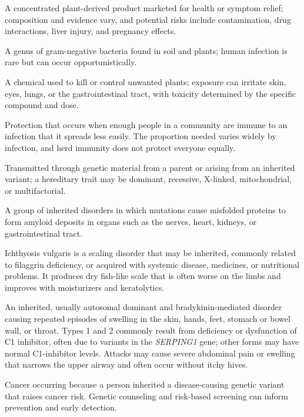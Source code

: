  A concentrated plant-derived product marketed for health or symptom relief; composition and evidence vary, and potential risks include contamination, drug interactions, liver injury, and pregnancy effects.

 A genus of gram-negative bacteria found in soil and plants; human infection is rare but can occur opportunistically.

 A chemical used to kill or control unwanted plants; exposure can irritate skin, eyes, lungs, or the gastrointestinal tract, with toxicity determined by the specific compound and dose.

 Protection that occurs when enough people in a community are immune to an infection that it spreads less easily. The proportion needed varies widely by infection, and herd immunity does not protect everyone equally.

 Transmitted through genetic material from a parent or arising from an inherited variant; a hereditary trait may be dominant, recessive, X-linked, mitochondrial, or multifactorial.

 A group of inherited disorders in which mutations cause misfolded proteins to form amyloid deposits in organs such as the nerves, heart, kidneys, or gastrointestinal tract.

 Ichthyosis vulgaris is a scaling disorder that may be inherited, commonly related to filaggrin deficiency, or acquired with systemic disease, medicines, or nutritional problems. It produces dry fish-like scale that is often worse on the limbs and improves with moisturizers and keratolytics.

 An inherited, usually autosomal dominant and bradykinin-mediated disorder causing repeated episodes of swelling in the skin, hands, feet, stomach or bowel wall, or throat. Types 1 and 2 commonly result from deficiency or dysfunction of C1 inhibitor, often due to variants in the \textit{SERPING1} gene; other forms may have normal C1-inhibitor levels. Attacks may cause severe abdominal pain or swelling that narrows the upper airway and often occur without itchy hives.

 Cancer occurring because a person inherited a disease-causing genetic variant that raises cancer risk. Genetic counseling and risk-based screening can inform prevention and early detection.

